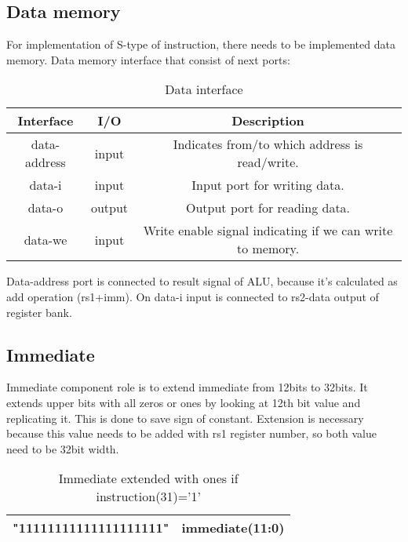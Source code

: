 \documentclass{scrreprt}
\begin{document}
\subsection*{Data memory}
For implementation of S-type of instruction, there needs to be implemented data memory. 
Data memory interface that consist of next ports:
\begin{table}[ht]
        \centering
        \begin{tabular}{|c|c|c|} \hline 
             Interface & I/O & Description \\ \hline  
             data-address & input & Indicates from/to which address is read/write.  \\ \hline  
             data-i & input & Input port for writing data.  \\ \hline
             data-o & output & Output port for reading data. \\ \hline
             data-we & input & Write enable signal indicating if we can write to memory. \\ \hline
        \end{tabular}
        \caption{Data interface}
        \label{tab:Data interface}
    \end{table}
    \hfill \break
Data-address port is connected to result signal of ALU, because it's calculated as add operation (rs1+imm). On data-i input is connected to rs2-data output of register bank. 
\subsection*{Immediate}
Immediate component role is to extend immediate from 12bits to 32bits. It extends upper bits with all zeros or ones by looking at 12th bit value and replicating it. This is done to save sign of constant. Extension is necessary because this value needs to be added with rs1 register number, so both value need to be 32bit width.
\begin{table}[htb!]
        \centering
        \begin{tabular}{|c|c|} \hline 
             "11111111111111111111" & immediate(11:0)  \\ \hline  
        \end{tabular}
        \caption{Immediate extended with ones if instruction(31)='1'}
        \label{tab:Ones interface}
    \end{table}
\end{document}
